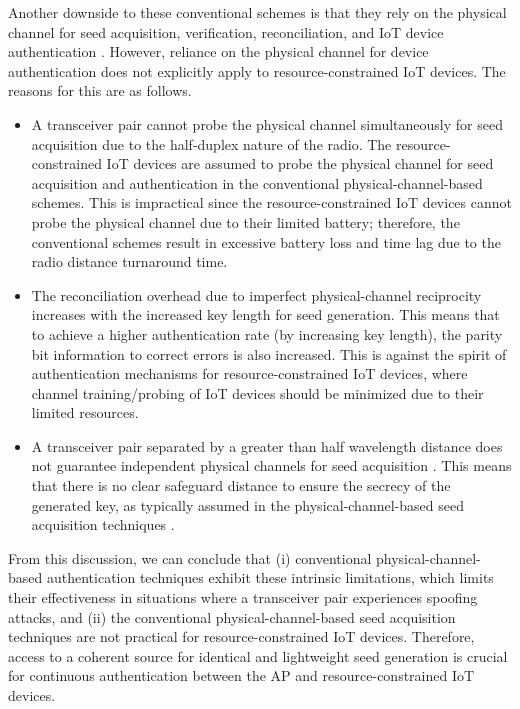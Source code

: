 \documentclass[journal,10pt]{IEEEtran}
\begin{document}
Another downside to these conventional schemes is that they rely on the physical channel for seed acquisition, verification, reconciliation, and IoT device authentication \cite{wang2016physical, paul2008physical, 9279294}. However, reliance on the physical channel for device authentication does not explicitly apply to resource-constrained IoT devices. The reasons for this are as follows. 
\begin{itemize}
    \item A transceiver pair cannot probe the physical channel simultaneously for seed acquisition due to the half-duplex nature of the radio. The resource-constrained IoT devices are assumed to probe the physical channel for seed acquisition and authentication in the conventional physical-channel-based schemes. This is impractical since the resource-constrained IoT devices cannot probe the physical channel due to their limited battery; therefore, the conventional schemes result in excessive battery loss and time lag due to the radio distance turnaround time.
    \item The reconciliation overhead due to imperfect physical-channel reciprocity increases with the increased key length for seed generation. This means that to achieve a higher authentication rate (by increasing key length), the parity bit information to correct errors is also increased. This is against the spirit of authentication mechanisms for resource-constrained IoT devices, where channel training/probing of IoT devices should be minimized due to their limited resources.
    \item A transceiver pair separated by a greater than half wavelength distance does not guarantee independent physical channels for seed acquisition \cite{edman2011passive}. This means that there is no clear safeguard distance to ensure the secrecy of the generated key, as typically assumed in the physical-channel-based seed acquisition techniques \cite{zeng2015physical}.
\end{itemize}
From this discussion, we can conclude that (i) conventional physical-channel-based authentication techniques exhibit these intrinsic limitations, which limits their effectiveness in situations where a transceiver pair experiences spoofing attacks, and (ii) the conventional physical-channel-based seed acquisition techniques are not practical for resource-constrained IoT devices. Therefore, access to a coherent source for identical and lightweight seed generation is crucial for continuous authentication between the AP and resource-constrained IoT devices.
\end{document}
